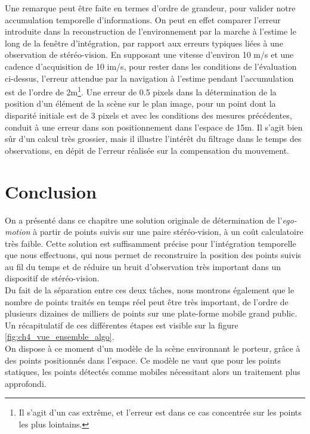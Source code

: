Une remarque peut être faite en termes d'ordre de grandeur, pour valider notre accumulation temporelle d'informations. On peut en effet comparer l'erreur introduite dans la reconstruction de l'environnement par la marche à l'estime le long de la fenêtre d'intégration, par rapport aux erreurs typiques liées à une observation de stéréo-vision. En supposant une vitesse d'environ 10 m/s et une cadence d'acquisition de 10 im/s, pour rester dans les conditions de l'évaluation ci-dessus, l'erreur attendue par la navigation à l'estime pendant l'accumulation est de l'ordre de 2m\footnote{Il s'agit d'un cas extrême, et l'erreur est dans ce cas concentrée sur les points les plus lointains.}. Une erreur de 0.5 pixels dans la détermination de la position d'un élément de la scène sur le plan image, pour un point dont la disparité initiale est de 3 pixels et avec les conditions des mesures précédentes, conduit à une erreur dans son positionnement dans l'espace de 15m. Il s'agit bien sûr d'un  calcul très grossier, mais il illustre l'intérêt du filtrage dans le temps des observations, en dépit de l'erreur réalisée sur la compensation du mouvement.

\section{Conclusion}
On a présenté dans ce chapitre une solution originale de détermination de l'\textit{ego-motion} à partir de points suivis sur une paire stéréo-vision, à un coût calculatoire très faible. Cette solution est suffisamment précise pour l'intégration temporelle que nous effectuons, qui nous permet de reconstruire la position des points suivis au fil du temps et de réduire un bruit d'observation très important dans un dispositif de stéréo-vision. \\
Du fait de la séparation entre ces deux tâches, nous montrons également que le nombre de points traités  en temps réel peut être très important, de l'ordre de plusieurs dizaines de milliers de points sur une plate-forme mobile grand public. Un récapitulatif de ces différentes étapes est visible sur la figure \ref{fig:ch4_vue_ensemble_algo}.\\

On dispose à ce moment d'un modèle de la scène environnant le porteur, grâce à des points positionnés dans l'espace. Ce modèle ne vaut que pour les points statiques, les points détectés comme mobiles nécessitant alors un traitement plus approfondi.


